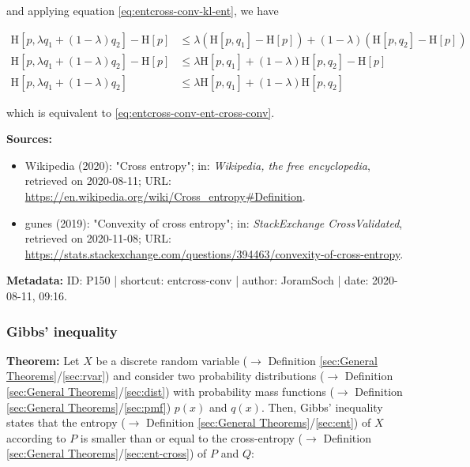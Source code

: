 \documentclass[a4paper,12pt,twoside]{book}
\begin{document}
and applying equation \eqref{eq:entcross-conv-kl-ent}, we have

\begin{equation} \label{eq:entcross-conv-ent-cross-conv-qed}
\begin{split}
\mathrm{H}[p,\lambda q_1 + (1-\lambda) q_2] - \mathrm{H}[p] &\leq \lambda \left( \mathrm{H}[p,q_1] - \mathrm{H}[p] \right) + (1-\lambda) \left( \mathrm{H}[p,q_2] - \mathrm{H}[p] \right) \\
\mathrm{H}[p,\lambda q_1 + (1-\lambda) q_2] - \mathrm{H}[p] &\leq \lambda \mathrm{H}[p,q_1] + (1-\lambda) \mathrm{H}[p,q_2] - \mathrm{H}[p] \\
\mathrm{H}[p,\lambda q_1 + (1-\lambda) q_2] &\leq \lambda \mathrm{H}[p,q_1] + (1-\lambda) \mathrm{H}[p,q_2]
\end{split}
\end{equation}

which is equivalent to \eqref{eq:entcross-conv-ent-cross-conv}.


\vspace{1em}
\textbf{Sources:}
\begin{itemize}
\item Wikipedia (2020): "Cross entropy"; in: \textit{Wikipedia, the free encyclopedia}, retrieved on 2020-08-11; URL: \url{https://en.wikipedia.org/wiki/Cross_entropy#Definition}.
\item gunes (2019): "Convexity of cross entropy"; in: \textit{StackExchange CrossValidated}, retrieved on 2020-11-08; URL: \url{https://stats.stackexchange.com/questions/394463/convexity-of-cross-entropy}.
\end{itemize}


\vspace{1em}
\textbf{Metadata:} ID: P150 | shortcut: entcross-conv | author: JoramSoch | date: 2020-08-11, 09:16.
\vspace{1em}



\subsubsection[\textbf{Gibbs' inequality}]{Gibbs' inequality} \label{sec:gibbs-ineq}
\setcounter{equation}{0}

\textbf{Theorem:} Let $X$ be a discrete random variable ($\rightarrow$ Definition \ref{sec:General Theorems}/\ref{sec:rvar}) and consider two probability distributions ($\rightarrow$ Definition \ref{sec:General Theorems}/\ref{sec:dist}) with probability mass functions ($\rightarrow$ Definition \ref{sec:General Theorems}/\ref{sec:pmf}) $p(x)$ and $q(x)$. Then, Gibbs' inequality states that the entropy ($\rightarrow$ Definition \ref{sec:General Theorems}/\ref{sec:ent}) of $X$ according to $P$ is smaller than or equal to the cross-entropy ($\rightarrow$ Definition \ref{sec:General Theorems}/\ref{sec:ent-cross}) of $P$ and $Q$:
\end{document}
